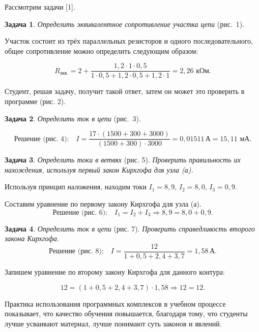 Рассмотрим задачи [1].

\textbf{Задача 1}. \textit{Определить эквивалентное сопротивление участка цепи} (рис.~1).

Участок состоит из трёх параллельных резисторов и одного последовательного, общее сопротивление можно определить следующим образом:

$$R_{\text{экв.}}=2+\frac{1,2\cdot1\cdot0,5}{1\cdot0,5+1,2\cdot0,5+1,2\cdot1}=2,26\text{ кОм.}$$

Студент, решая задачу, получит такой ответ, затем он может это проверить в программе (рис. 2).





\textbf{Задача 2}. \textit{Определить ток в цепи} (рис.~3).

$$\text{Решение (рис.~4):}\quad I=\frac{17\cdot(1500+300+3000)}{(1500+300)\cdot3000}=0,01511\,\text{А}=15,11\text{ мА.}$$

\vspace{-16pt}


\textbf{Задача 3}. \textit{Определить токи в ветвях} (рис. 5). \textit{Проверить правильность их нахождения, используя первый закон Кирхгофа для узла (а).}

Используя принцип наложения, находим токи $I_1=8,9$, $I_2=8,0$, $I_3=0,9$.

Составим уравнение по первому закону Кирхгофа для узла (а).
\vspace{-6pt}
$$\text{Решение (рис. 6):}\quad I_1=I_2+I_3\Rightarrow8,9=8,0+0,9.$$
\vspace{-8pt}

\clearpage

\textbf{Задача 4}. \textit{Определить ток в цепи} (рис. 7). \textit{Проверить справедливость второго закона Кирхгофа.}
\vspace{-2pt}
$$\text{Решение (рис.~8):}\quad I=\frac{12}{1+0,5+2,4+3,7}=1,58\,\text{А.}$$

Запишем уравнение по второму закону Кирхгофа для данного контура:

$$12=(1+0,5+2,4+3,7)\cdot1,58\Rightarrow12=12.$$



Практика использования программных комплексов в учебном процессе показывает, что качество обучения повышается, благодаря тому, что студенты лучше усваивают материал, лучше понимают суть законов и явлений.

